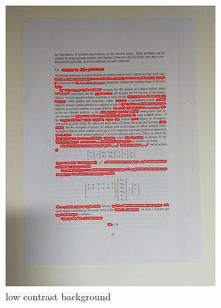 \documentclass[bibliography=totoc]{scrartcl}
\begin{document}
\begin{figure}[H]
	\centering
	\begin{subfigure}[t]{0.3\linewidth}
		\includegraphics[width=\linewidth]{imgs/contours/white_background.jpg}
		\caption{low contrast background}
		\label{subfig:white_background}
	\end{subfigure}
	\hspace{0.02\textwidth}
	\begin{subfigure}[t]{0.3\linewidth}

\end{subfigure}
\end{figure}
\end{document}

